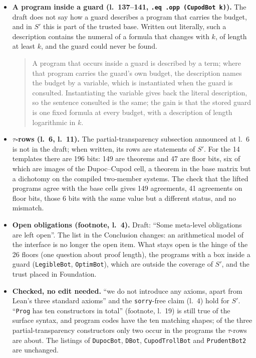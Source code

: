 \begin{itemize}
\item \textbf{A program inside a guard (l.~137--141, \texttt{.eq .opp (CupodBot k)}).} The draft does not say how a guard describes a program that carries the budget, and in $S'$ this is part of the trusted base. Written out literally, such a description contains the numeral of a formula that changes with $k$, of length at least $k$, and the guard could never be found.
\begin{quote}
A program that occurs inside a guard is described by a term; where that program carries the guard's own budget, the description names the budget by a variable, which is instantiated when the guard is consulted. Instantiating the variable gives back the literal description, so the sentence consulted is the same; the gain is that the stored guard is one fixed formula at every budget, with a description of length logarithmic in $k$.
\end{quote}
\item \textbf{$\tau$-rows (l.~6, l.~11).} The partial-transparency subsection announced at l.~6 is not in the draft; when written, its rows are statements of $S'$. For the 14 templates there are 196 bits: 149 are theorems and 47 are floor bits, six of which are images of the Dupoc--Cupod cell, a theorem in the base matrix but a dichotomy on the compiled two-member systems. The check that the lifted programs agree with the base cells gives 149 agreements, 41 agreements on floor bits, those 6 bits with the same value but a different status, and no mismatch.
\item \textbf{Open obligations (footnote, l.~4).} Draft: ``Some meta-level obligations are left open''. The list in the Conclusion changes: an arithmetical model of the interface is no longer the open item. What stays open is the hinge of the 26 floors (one question about proof length), the programs with a box inside a guard (\texttt{LegibleBot}, \texttt{OptimBot}), which are outside the coverage of $S'$, and the trust placed in Foundation.
\item \textbf{Checked, no edit needed.} ``we do not introduce any axioms, apart from Lean's three standard axioms'' and the \texttt{sorry}-free claim (l.~4) hold for $S'$. ``\texttt{Prog} has ten constructors in total'' (footnote, l.~19) is still true of the surface syntax, and program codes have the ten matching shapes; of the three partial-transparency constructors only two occur in the programs the $\tau$-rows are about. The listings of \texttt{DupocBot}, \texttt{DBot}, \texttt{CupodTrollBot} and \texttt{PrudentBot2} are unchanged.
\end{itemize}
